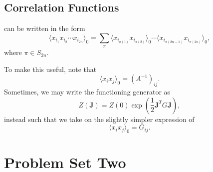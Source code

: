 \documentclass{article}
\numberwithin{equation}{section}
\begin{document}
\subsection{Correlation Functions}
\begin{theorem}
     can be written in the form 
    \begin{equation}
        \langle x_{i_1}x_{i_2}\cdots x_{i_{2n}}\rangle_0 = \sum_\pi \langle x_{i_{\pi(1)}}x_{i_{\pi(2)}}\rangle_0  \cdots \langle x_{i_{\pi(2n-1)}}x_{i_{\pi(2n)}}\rangle_0,
    \end{equation}
    where $\pi \in S_{2n}.$
\end{theorem}
To make this useful, note that 
\begin{equation*}
    \boxed{\langle x_ix_j\rangle_0 = (A^{-1})_{ij}.}
\end{equation*}
Sometimes, we may write the functioning generator as 
\begin{equation*}
    Z(\bm{J}) = Z(0)\exp\left(\frac{1}{2}\bm{J}^TG\bm{J}\right),
\end{equation*}
instead such that we take on the slightly simpler expression of 
\begin{equation*}
    \langle x_ix_j\rangle_0 = G_{ij}.
\end{equation*}
\section{Problem Set Two}
\end{document}
